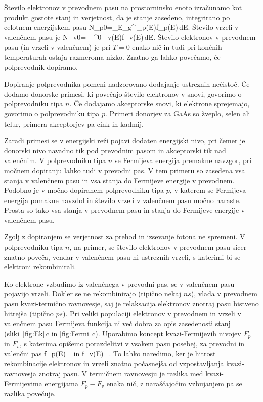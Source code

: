 Število elektronov v prevodnem pasu na prostorninsko enoto izračunamo kot 
produkt gostote stanj in verjetnost, da je stanje zasedeno, integrirano po 
celotnem energijskem pasu
\beq
N_{p0}=\int_{E_g}^{\infty}\,\rho_p(E)f_p(E)\,dE.
\label{6.3a}
\eeq
Število vrzeli v valenčnem pasu je 
\beq
N_{v0}=\int_{-\infty}^{0}\,\rho_v(E)f_v(E)\,dE.
\label{6.3b}
\eeq
Število elektronov v prevodnem pasu (in vrzeli v valenčnem) je pri
$T=0$ enako nič in tudi pri končnih temperaturah ostaja razmeroma nizko. 
Znatno ga lahko povečamo, če polprevodnik dopiramo.

Dopiranje polprevodnika pomeni nadzorovano dodajanje ustreznih nečistoč. 
Če dodamo donorske primesi, ki povečajo število elektronov v snovi, 
govorimo o polprevodniku tipa $n$. Če dodajamo akceptorske snovi, ki 
elektrone sprejemajo, govorimo o polprevodniku tipa $p$. 
Primeri donorjev za GaAs so žveplo, selen ali telur,
primera akceptorjev pa cink in kadmij. 

Zaradi primesi se v energijski 
reži pojavi dodaten energijski nivo, pri čemer je donorski nivo navadno 
tik pod prevodnim pasom in akceptorski tik nad valenčnim. V polprevodniku tipa $n$ se
Fermijeva energija premakne navzgor, pri močnem dopiranju lahko tudi v 
prevodni pas. V tem primeru so zasedena vsa stanja v valenčnem pasu in vsa
stanja do Fermijeve energije v prevodnem. Podobno je v močno dopiranem polprevodniku tipa 
$p$, v katerem se Fermijeva energija pomakne navzdol in število vrzeli v valenčnem 
pasu močno naraste. Prosta so tako vsa stanja v prevodnem pasu in stanja do 
Fermijeve energije v valenčnem pasu.

\begin{remark}
 Zgolj z dopiranjem se verjetnost za prehod in izsevanje fotona ne spremeni. V
 polprevodniku tipa $n$, na primer, se število elektronov v prevodnem pasu sicer znatno poveča, 
 vendar v valenčnem pasu ni ustreznih vrzeli, s katerimi bi se elektroni rekombinirali.
\end{remark}

Ko elektrone vzbudimo iz valenčnega v prevodni pas, se v valenčnem pasu pojavijo
vrzeli. Dokler se ne rekombinirajo (tipično nekaj $\si{ns}$),
vlada v prevodnem pasu kvazi-termično ravnovesje, saj je relaksacija 
elektronov znotraj pasu bistveno hitrejša (tipično $\si{ps}$). 
Pri veliki populaciji elektronov v prevodnem in vrzeli v 
valenčnem pasu Fermijeva funkcija ni več dobra za opis zasedenosti stanj 
(sliki~\ref{fig:Ek}\,c in \ref{fig:Fermi}\,c). Uporabimo 
koncept kvazi-Fermijevih nivojev $F_p$ in $F_v$, s katerima opišemo porazdelitvi
v vsakem pasu posebej, za prevodni in valenčni pas
\beq
f_p(E)=
\label{eq:fDppas}
\eeq
in 
\beq
f_v(E)=.
\label{eq:fDvpas}
\eeq
To lahko naredimo, ker je hitrost rekombinacije elektronov in vrzeli znatno počasnejša
od vzpostavljanja kvazi-ravnovesja znotraj pasu. V termičnem ravnovesju je razlika med 
kvazi-Fermijevima energijama $F_{p}-F_v$ enaka nič, z naraščajočim vzbujanjem pa se 
razlika povečuje.

